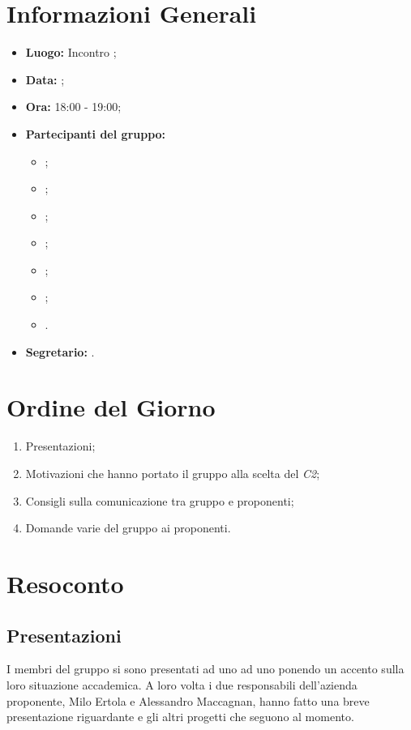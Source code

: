 \section{Informazioni Generali}
\begin{itemize}
\item \textbf{Luogo:} Incontro ;
\item \textbf{Data:} \Data;
\item \textbf{Ora:} 18:00 - 19:00;
\item \textbf{Partecipanti del gruppo:}
	\begin{itemize}
		\item \BL{}; 
		\item \FF{};
		\item \MM{}; 
		\item \PC{};
		\item \TG{};
		\item \TL{};
		\item \VD{}.
	\end{itemize} 
\item \textbf{Segretario:} \PC{}.
\end{itemize}

\section{Ordine del Giorno}
\begin{enumerate}
	\item Presentazioni;
	\item Motivazioni che hanno portato il gruppo {\Gruppo} alla scelta del  \textit{C2};
	\item Consigli sulla comunicazione tra gruppo e proponenti;
	\item Domande varie del gruppo ai proponenti.
\end{enumerate}

\section{Resoconto}
\subsection{Presentazioni}
I membri del gruppo {\Gruppo} si sono presentati ad uno ad uno ponendo un accento sulla loro situazione accademica. A loro volta i due responsabili dell'azienda proponente, Milo Ertola e Alessandro Maccagnan, hanno fatto una breve presentazione riguardante {\Proponente} e gli altri progetti che seguono al momento.

